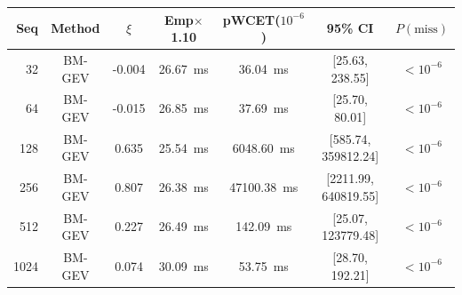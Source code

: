 \begin{tabular}{@{}rcccccc@{}}
\toprule
Seq & Method & $\xi$ & Emp$\times$1.10 & pWCET($10^{-6}$) & 95\% CI & $P(\text{miss})$ \\
\midrule
32 & BM-GEV & -0.004 & 26.67~ms & 36.04~ms & [25.63, 238.55] & $<10^{-6}$ \\
64 & BM-GEV & -0.015 & 26.85~ms & 37.69~ms & [25.70, 80.01] & $<10^{-6}$ \\
128 & BM-GEV & 0.635 & 25.54~ms & 6048.60~ms & [585.74, 359812.24] & $<10^{-6}$ \\
256 & BM-GEV & 0.807 & 26.38~ms & 47100.38~ms & [2211.99, 640819.55] & $<10^{-6}$ \\
512 & BM-GEV & 0.227 & 26.49~ms & 142.09~ms & [25.07, 123779.48] & $<10^{-6}$ \\
1024 & BM-GEV & 0.074 & 30.09~ms & 53.75~ms & [28.70, 192.21] & $<10^{-6}$ \\
\bottomrule
\end{tabular}

